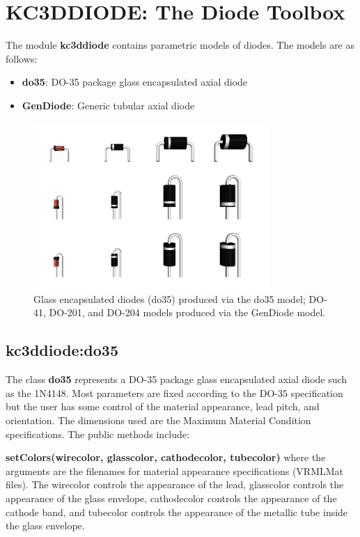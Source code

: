 \section{KC3DDIODE: The Diode Toolbox}
The module \textbf{kc3ddiode} contains parametric models
of diodes. The models are as follows:

\begin{itemize}
\item \textbf{do35}: DO-35 package glass encapsulated axial diode
\item \textbf{GenDiode}: Generic tubular axial diode
\end{itemize}

\begin{figure}
\label{fig:k3ddiode-diodes}
\centering
\includegraphics[width = 0.8\textwidth]{img/k3ddiode.png}
\caption{Glass encapsulated diodes (do35) produced via the do35 model;
DO-41, DO-201, and DO-204 models produced via the GenDiode model.}
\end{figure}

\subsection{kc3ddiode:do35}
The class \textbf{do35} represents a DO-35 package glass encapsulated
axial diode such as the 1N4148. Most parameters are fixed according
to the DO-35 specification but the user has some control of the
material appearance, lead pitch, and orientation. The dimensions used
are the Maximum Material Condition specifications. The public methods
include:

\textbf{setColors(wirecolor, glasscolor, cathodecolor, tubecolor)}
where the arguments are the filenames for material appearance specifications
(VRMLMat files). The wirecolor controls the appearance of the lead,
glasscolor controls the appearance of the glass envelope,
cathodecolor controls the appearance of the cathode band, and
tubecolor controls the appearance of the metallic tube inside the
glass envelope.

